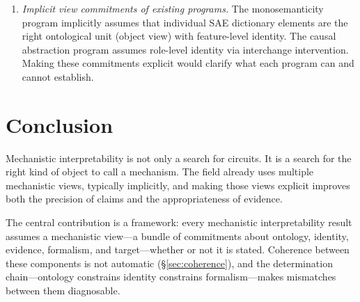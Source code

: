 \documentclass{article}
\begin{document}
\begin{enumerate}[leftmargin=*]
      (monitoring, alignment auditing) require mechanistic claims that are
      robust to adversarial distribution shift.  What minimum view supports
      safety-relevant inference?  The object view is likely insufficient---a
      head identified as safety-relevant on one distribution may not
      generalize.  The structural or stratified views may be necessary, but
      their evidential demands are currently impractical at scale.
\item \emph{Implicit view commitments of existing programs.}  The
      monosemanticity program \citep{bricken2023,templeton2024} implicitly
      assumes that individual SAE dictionary elements are the right ontological
      unit (object view) with feature-level identity.  The causal abstraction
      program \citep{geiger2021,geiger2024} assumes role-level identity via
      interchange intervention.  Making these commitments explicit would
      clarify what each program can and cannot establish.
\end{enumerate}

\section{Conclusion}

Mechanistic interpretability is not only a search for circuits.  It is
a search for the right kind of object to call a mechanism.  The field
already uses multiple mechanistic views, typically implicitly, and making
those views explicit improves both the precision of claims and the
appropriateness of evidence.

The central contribution is a framework: every mechanistic
interpretability result assumes a mechanistic view---a bundle of
commitments about ontology, identity, evidence, formalism, and
target---whether or not it is stated.  Coherence between these
components is not automatic (\S\ref{sec:coherence}), and the
determination chain---ontology constrains identity constrains
formalism---makes mismatches between them diagnosable.
\end{document}
